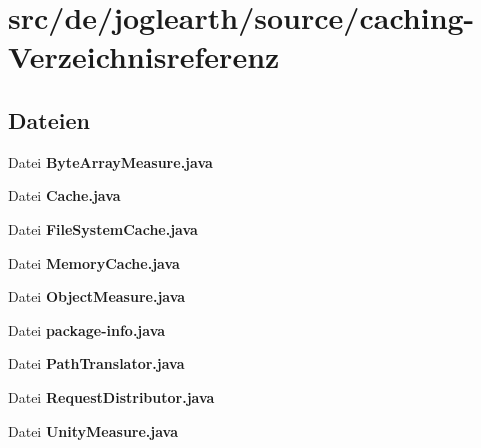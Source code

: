\section{src/de/joglearth/source/caching-\/\-Verzeichnisreferenz}
\label{dir_cb2e04df9c81f84c08ceb5577c753ff0}
\subsection*{Dateien}
\begin{DoxyCompactItemize}
\item 
Datei {\bfseries Byte\-Array\-Measure.\-java}
\item 
Datei {\bfseries Cache.\-java}
\item 
Datei {\bfseries File\-System\-Cache.\-java}
\item 
Datei {\bfseries Memory\-Cache.\-java}
\item 
Datei {\bfseries Object\-Measure.\-java}
\item 
Datei {\bfseries package-\/info.\-java}
\item 
Datei {\bfseries Path\-Translator.\-java}
\item 
Datei {\bfseries Request\-Distributor.\-java}
\item 
Datei {\bfseries Unity\-Measure.\-java}
\end{DoxyCompactItemize}
